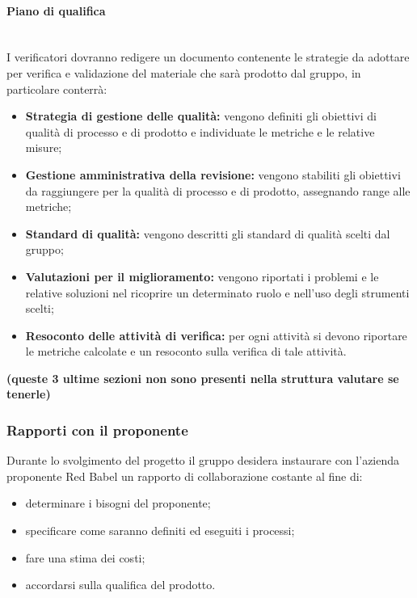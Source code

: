 \paragraph{Piano di qualifica} \mbox{}\\
I verificatori dovranno redigere un documento contenente le strategie da adottare per verifica e validazione del materiale che sarà prodotto dal gruppo, in particolare conterrà:
\begin{itemize}
	\item \textbf{Strategia di gestione delle qualità:} vengono definiti gli obiettivi di qualità di processo e di prodotto e individuate le metriche e le relative misure;
	\item \textbf{Gestione amministrativa della revisione:} vengono stabiliti gli obiettivi da raggiungere per la qualità di processo e di prodotto, assegnando range alle metriche;
	\item \textbf{Standard di qualità:} vengono descritti gli standard di qualità scelti dal gruppo;
	\item \textbf{Valutazioni per il miglioramento:} vengono riportati i problemi e le relative soluzioni nel ricoprire un determinato ruolo e nell'uso degli strumenti scelti;
	\item \textbf{Resoconto delle attività di verifica:} per ogni attività si devono riportare le metriche calcolate e un resoconto sulla verifica di tale attività.
\end{itemize}
\textbf{(queste 3 ultime sezioni non sono presenti nella struttura valutare se tenerle)}
\subsubsection{Rapporti con il proponente}
Durante lo svolgimento del progetto il gruppo desidera instaurare con l'azienda proponente Red Babel un rapporto di collaborazione costante al fine di:
\begin{itemize}
	\item determinare i bisogni del proponente;
	\item specificare come saranno definiti ed eseguiti i processi;
	\item fare una stima dei costi;
	\item accordarsi sulla qualifica del prodotto.
\end{itemize}
